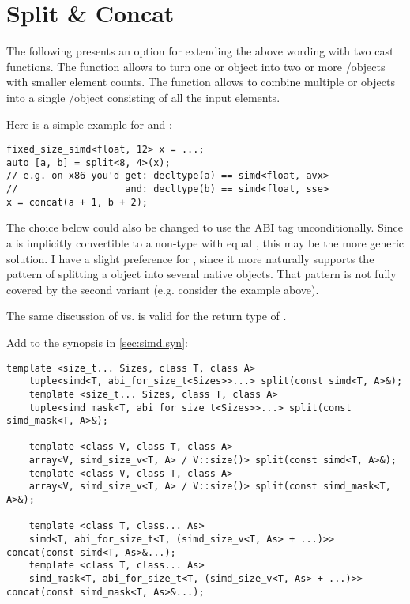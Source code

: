 \section{Split \& Concat}\label{sec:split and concat}
The following presents an option for extending the above wording with two cast functions.
The  function allows to turn one \simd or \mask object into two or more \simd/\mask objects with smaller element counts.
The  function allows to combine multiple \simd or \mask objects into a single \simd/\mask object consisting of all the input elements.

 Here is a simple example for  and :
 \smallskip
\begin{lstlisting}[style=Vc]
fixed_size_simd<float, 12> x = ...;
auto [a, b] = split<8, 4>(x);
// e.g. on x86 you'd get: decltype(a) == simd<float, avx>
//                   and: decltype(b) == simd<float, sse>
x = concat(a + 1, b + 2);
\end{lstlisting}

The  choice below could also be changed to use the \fixedsize ABI tag unconditionally.
Since a \fixedsize \simd is implicitly convertible to a non-\fixedsize \simd type with equal , this may be the more generic solution.
I have a slight preference for , since it more naturally supports the pattern of splitting a \fixedsize object into several native \simd objects.
That pattern is not fully covered by the second  variant (e.g. consider the example above).

The same discussion of  vs. \fixedsize is valid for the return type of .

Add to the synopsis in \ref{sec:simd.syn}:
\begin{wgText}
  \begin{lstlisting}[style=Vc]
    template <size_t... Sizes, class T, class A>
    tuple<simd<T, abi_for_size_t<Sizes>>...> split(const simd<T, A>&);
    template <size_t... Sizes, class T, class A>
    tuple<simd_mask<T, abi_for_size_t<Sizes>>...> split(const simd_mask<T, A>&);

    template <class V, class T, class A>
    array<V, simd_size_v<T, A> / V::size()> split(const simd<T, A>&);
    template <class V, class T, class A>
    array<V, simd_size_v<T, A> / V::size()> split(const simd_mask<T, A>&);

    template <class T, class... As>
    simd<T, abi_for_size_t<T, (simd_size_v<T, As> + ...)>> concat(const simd<T, As>&...);
    template <class T, class... As>
    simd_mask<T, abi_for_size_t<T, (simd_size_v<T, As> + ...)>> concat(const simd_mask<T, As>&...);
  \end{lstlisting}
\end{wgText}

